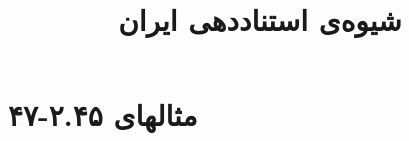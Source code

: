 \documentclass[a4paper,10pt]{article}
\begin{document}
\title{شیوه‌ی استناددهی ایران}
\author{}
\date{}
\maketitle



\section*{مثالهای ۲.۴۵-۴۷}

\cite{پرهام1364}\\
\\
\cite{حافظ1379}\\
\\






\end{document}
